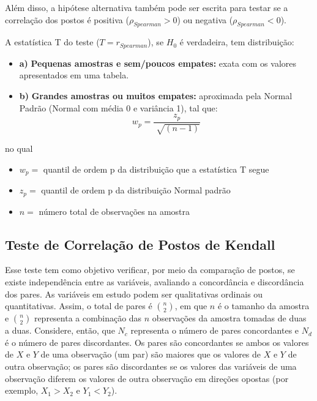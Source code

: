 \documentclass[
]{estat/estat}
\providecommand{\tightlist}{%
  \setlength{\itemsep}{0pt}\setlength{\parskip}{0pt}}\usepackage{longtable,booktabs,array}
\begin{document}
Além disso, a hipótese alternativa também pode ser escrita para testar
se a correlação dos postos é positiva (\(\rho_{Spearman} > 0\)) ou
negativa (\(\rho_{Spearman} < 0\)).

A estatística T do teste (\(T=r_{Spearman}\)), se \(H_0\) é verdadeira,
tem distribuição:

\begin{itemize}
\tightlist
\item
  \textbf{a)} \textbf{Pequenas amostras e sem/poucos empates:} exata com
  os valores apresentados em uma tabela.
\item
  \textbf{b)} \textbf{Grandes amostras ou muitos empates:} aproximada
  pela Normal Padrão (Normal com média 0 e variância 1), tal que: \[
  w_p = \frac{z_p}{\sqrt[]{(n-1)}}
  \]
\end{itemize}

no qual

\begin{itemize}
\tightlist
\item
  \(w_p=\) quantil de ordem p da distribuição que a estatística T segue
\item
  \(z_p=\) quantil de ordem p da distribuição Normal padrão
\item
  \(n=\) número total de observações na amostra
\end{itemize}

\subsection{Teste de Correlação de Postos de
Kendall}\label{teste-de-correlauxe7uxe3o-de-postos-de-kendall}

Esse teste tem como objetivo verificar, por meio da comparação de
postos, se existe independência entre as variáveis, avaliando a
concordância e discordância dos pares. As variáveis em estudo podem ser
qualitativas ordinais ou quantitativas. Assim, o total de pares é
\(\binom{n}{2}\), em que \(n\) é o tamanho da amostra e \(\binom{n}{2}\)
representa a combinação das \(n\) observações da amostra tomadas de duas
a duas. Considere, então, que \(N_{c}\) representa o número de pares
concordantes e \(N_{d}\) é o número de pares discordantes. Os pares são
concordantes se ambos os valores de \(X\) e \(Y\) de uma observação (um
par) são maiores que os valores de \(X\) e \(Y\) de outra observação; os
pares são discordantes se os valores das variáveis de uma observação
diferem os valores de outra observação em direções opostas (por exemplo,
\(X_{1} > X_{2}\) e \(Y_{1} < Y_{2}\)).
\end{document}
